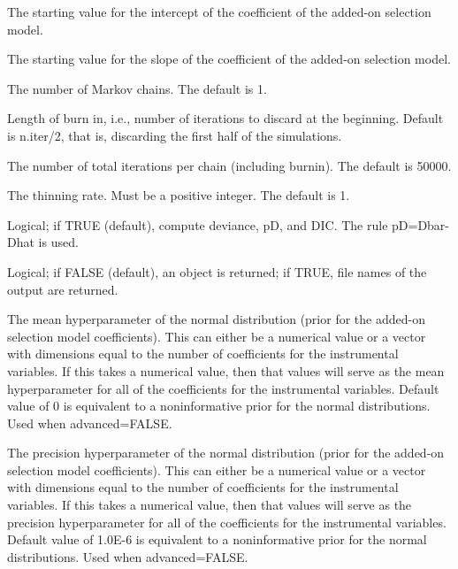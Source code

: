 \documentclass[a4paper]{book}
\begin{document}
\begin{Arguments}
\begin{ldescription}
\item[\code{lambda0.start}] The starting value for the intercept of the coefficient of the added-on selection model.

\item[\code{lambda1.start}] The starting value for the slope of the coefficient of the added-on selection model.

\item[\code{n.chains}] The number of Markov chains. The default is 1.

\item[\code{n.burnin}] Length of burn in, i.e., number of iterations to discard at the beginning.
Default is n.iter/2, that is, discarding the first half of the simulations.

\item[\code{n.iter}] The number of total iterations per chain (including burnin). The default is 50000.

\item[\code{n.thin}] The thinning rate. Must be a positive integer. The default is 1.

\item[\code{DIC}] Logical; if TRUE (default), compute deviance, pD, and DIC. The rule pD=Dbar-Dhat is used.

\item[\code{codaPkg}] Logical; if FALSE (default), an object is returned; if TRUE,
file names of the output are returned.

\item[\code{l0}] The mean hyperparameter of the normal distribution (prior for the added-on selection model coefficients).
This can either be a numerical value or a vector with dimensions equal to the number of coefficients for the instrumental variables.
If this takes a numerical value, then that values will serve as the mean hyperparameter for all of the coefficients
for the instrumental variables. Default value of 0 is equivalent to a noninformative prior for the normal distributions.
Used when advanced=FALSE.

\item[\code{L0}] The precision hyperparameter of the normal distribution (prior for the added-on selection model coefficients).
This can either be a numerical value or a vector with dimensions equal to the number of coefficients for the instrumental variables.
If this takes a numerical value, then that values will serve as the precision hyperparameter for all of the coefficients
for the instrumental variables.
Default value of 1.0E-6 is equivalent to a noninformative prior for the normal distributions.
Used when advanced=FALSE.
\end{ldescription}
\end{Arguments}
\end{document}
